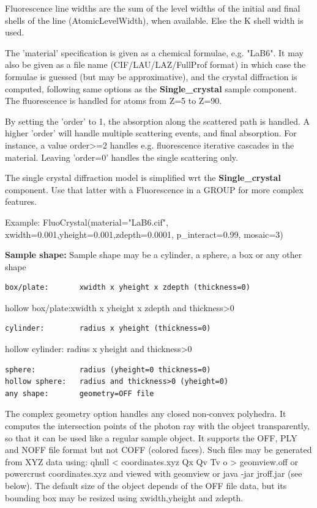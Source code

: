 Fluorescence line widths are the sum of the level widths of the initial and final shells of the line (AtomicLevelWidth), when available. Else the K shell width is used.

The 'material' specification is given as a chemical formulae, e.g. "LaB6". It may also be given as a file name (CIF/LAU/LAZ/FullProf format) in which case the formulae is guessed (but may be approximative), and the crystal diffraction is computed, following same options as the \textbf{Single\_crystal} sample component. The fluorescence is handled for atoms from Z=5 to Z=90.

By setting the 'order' to 1, the absorption along the scattered path is handled. A higher 'order' will handle multiple scattering events, and final absorption. For instance, a value order\textgreater{}=2 handles e.g. fluorescence iterative cascades in the material. Leaving 'order=0' handles the single scattering only.

The single crystal diffraction model is simplified wrt the \textbf{Single\_crystal} component. Use that latter with a Fluorescence in a GROUP for more complex features.

Example: FluoCrystal(material="LaB6.cif", xwidth=0.001,yheight=0.001,zdepth=0.0001, p\_interact=0.99, mosaic=3)

\textbf{Sample shape:} Sample shape may be a cylinder, a sphere, a box or any other shape

\begin{verbatim}
box/plate:       xwidth x yheight x zdepth (thickness=0)
\end{verbatim}

hollow box/plate:xwidth x yheight x zdepth and thickness\textgreater{}0

\begin{verbatim}
cylinder:        radius x yheight (thickness=0)
\end{verbatim}

hollow cylinder: radius x yheight and thickness\textgreater{}0

\begin{verbatim}
sphere:          radius (yheight=0 thickness=0)
hollow sphere:   radius and thickness>0 (yheight=0)
any shape:       geometry=OFF file
\end{verbatim}

The complex geometry option handles any closed non-convex polyhedra. It computes the intersection points of the photon ray with the object transparently, so that it can be used like a regular sample object. It supports the OFF, PLY and NOFF file format but not COFF (colored faces). Such files may be generated from XYZ data using: qhull \textless{} coordinates.xyz Qx Qv Tv o \textgreater{} geomview.off or powercrust coordinates.xyz and viewed with geomview or java -jar jroff.jar (see below). The default size of the object depends of the OFF file data, but its bounding box may be resized using xwidth,yheight and zdepth.

